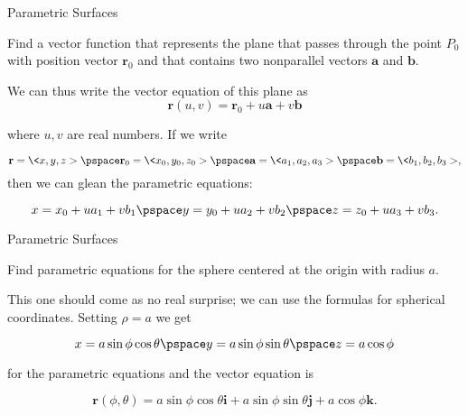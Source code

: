 \documentclass[11pt,english,
handout
]{beamer}
\begin{document}
\begin{frame}[t]{Parametric Surfaces}
\small
\begin{example}
Find a vector function that represents the plane that passes through the point $P_0$ with position vector $\mathbf{r}_0$ and that contains two nonparallel vectors $\mathbf{a}$ and $\mathbf{b}$.

\lspace
We can thus write the vector equation of this plane as
\[
\mathbf{r}(u,v)=\mathbf{r}_0+u\mathbf{a}+v\mathbf{b}
\]

where $u,v$ are real numbers. \pause If we write

\[
\mathbf{r}=\<x,y,z>\pspace \mathbf{r}_0=\<x_0,y_0,z_0>\pspace \mathbf{a}=\<a_1,a_2,a_3>\pspace \mathbf{b}=\<b_1,b_2,b_3>,
\]
then we can glean the parametric equations:

\[
x=x_0+ua_1+vb_1\pspace y=y_0+ua_2+vb_2\pspace z=z_0+ua_3+vb_3.
\]
\end{example}
\end{frame}















\begin{frame}[t]{Parametric Surfaces}
\small
\begin{example}
Find parametric equations for the sphere centered at the origin with radius $a$.\pause

\lspace
This one should come as no real surprise; we can use the formulas for spherical coordinates. \pause Setting $\rho=a$ we get

\[
x=a\sin\phi\cos\theta\pspace y=a\sin\phi\sin\theta \pspace z=a\cos\phi
\]

for the parametric equations and the vector equation is

\[
\mathbf{r}(\phi,\theta)=a\sin\phi\cos\theta\mathbf{i}+a\sin\phi\sin\theta\mathbf{j}+a\cos\phi\mathbf{k}.
\]
\end{example}
\end{frame}
\end{document}
